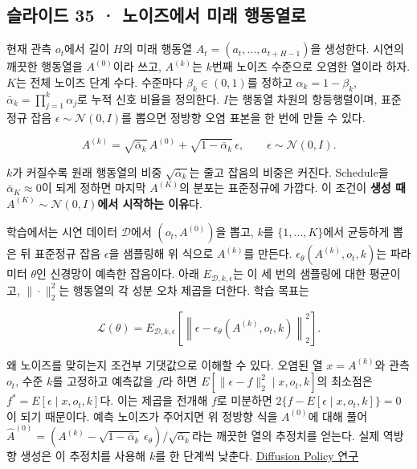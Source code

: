 \documentclass[11pt,a4paper]{article}
\begin{document}
\subsection{슬라이드 35 · 노이즈에서 미래 행동열로}

현재 관측 $o_t$에서 길이 $H$의 미래 행동열 $A_t=(a_t,\ldots,a_{t+H-1})$을 생성한다. 시연의 깨끗한 행동열을 $A^{(0)}$이라 쓰고, $A^{(k)}$는 $k$번째 노이즈 수준으로 오염한 열이라 하자. $K$는 전체 노이즈 단계 수다. 수준마다 $\beta_k\in(0,1)$를 정하고 $\alpha_k=1-\beta_k$, $\bar\alpha_k=\prod_{j=1}^{k}\alpha_j$로 누적 신호 비율을 정의한다. $I$는 행동열 차원의 항등행렬이며, 표준정규 잡음 $\epsilon\sim\mathcal N(0,I)$를 뽑으면 정방향 오염 표본을 한 번에 만들 수 있다.\par

\[
A^{(k)}=\sqrt{\bar\alpha_k}\,A^{(0)}
+\sqrt{1-\bar\alpha_k}\,\epsilon,
\qquad \epsilon\sim\mathcal N(0,I).
\]

$k$가 커질수록 원래 행동열의 비중 $\sqrt{\bar\alpha_k}$는 줄고 잡음의 비중은 커진다. Schedule을 $\bar\alpha_K\approx0$이 되게 정하면 마지막 $A^{(K)}$의 분포는 표준정규에 가깝다. 이 조건이 \textbf{생성 때 $A^{(K)}\sim\mathcal N(0,I)$에서 시작하는 이유}다.\par

학습에서는 시연 데이터 $\mathcal D$에서 $(o_t,A^{(0)})$을 뽑고, $k$를 $\{1,\ldots,K\}$에서 균등하게 뽑은 뒤 표준정규 잡음 $\epsilon$을 샘플링해 위 식으로 $A^{(k)}$를 만든다. $\epsilon_\theta(A^{(k)},o_t,k)$는 파라미터 $\theta$인 신경망이 예측한 잡음이다. 아래 $E_{\mathcal D,k,\epsilon}$는 이 세 번의 샘플링에 대한 평균이고, $\|\cdot\|_2^2$는 행동열의 각 성분 오차 제곱을 더한다. 학습 목표는\par

\[
\mathcal L(\theta)=
E_{\mathcal D,k,\epsilon}
\left[\left\|\epsilon-
\epsilon_\theta(A^{(k)},o_t,k)\right\|_2^2\right].
\]

왜 노이즈를 맞히는지 조건부 기댓값으로 이해할 수 있다. 오염된 열 $x=A^{(k)}$와 관측 $o_t$, 수준 $k$를 고정하고 예측값을 $f$라 하면 $E[\|\epsilon-f\|_2^2\mid x,o_t,k]$의 최소점은 $f^*=E[\epsilon\mid x,o_t,k]$다. 이는 제곱을 전개해 $f$로 미분하면 $2\{f-E[\epsilon\mid x,o_t,k]\}=0$이 되기 때문이다. 예측 노이즈가 주어지면 위 정방향 식을 $A^{(0)}$에 대해 풀어 $\widehat A^{(0)}=(A^{(k)}-\sqrt{1-\bar\alpha_k}\,\epsilon_\theta)/\sqrt{\bar\alpha_k}$라는 깨끗한 열의 추정치를 얻는다. 실제 역방향 생성은 이 추정치를 사용해 $k$를 한 단계씩 낮춘다. \href{https://journals.sagepub.com/doi/full/10.1177/02783649241273668}{Diffusion Policy 연구}\par
\end{document}

